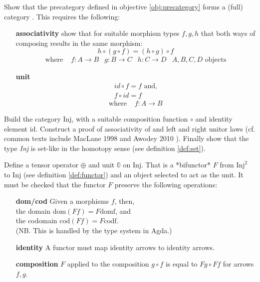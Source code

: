 \begin{objective} \label{obj:category}
  Show that the precategory defined in objective \ref{obj:precategory} forms a
  (full) category \cite{awodey2010-category-theory-book}. This requires the following:
  \begin{itemize}
  \item[\textbf{associativity}] show that for suitable morphism types $f,g,h$ that both ways of composing results in the same morphism:
    $$
    h \circ (g \circ f) = (h \circ g) \circ f
    $$
    \begin{align*}
      \text{where } & f : A \to B
      & g : B \to C
      & h : C \to D
      & A, B, C, D \text{ objects}
    \end{align*}
  \item[\textbf{unit}]
    \begin{align*}
    \mathit{id} \circ f = f \text{ and,}\\ 
    f \circ \mathit{id} = f
    \end{align*}
    \begin{align*}
      \text{where } & f : A \to B
    \end{align*}
  \end{itemize}

  Build the category \textrm{Inj}, with a suitable composition function $\circ$ and
  identity element $\mathrm{id}$. Construct a proof of associativity of and
  left and right unitor laws (cf. common texts include MacLane 1998 and Awodey
  2010 \cite{maclane1998-categories-book,awodey2010-category-theory-book}).
  Finally show that the type \textit{Inj} is set-like in the homotopy sense (see definition \ref{def:set}).
\end{objective}
\begin{objective} \label{obj:tensor}
  Define a tensor operator $\oplus$ and unit $𝟘$ on \textrm{Inj}.
  That is a *bifunctor* $F$ from $\textrm{Inj}^2$ to \textrm{Inj} (see definition \ref{def:functor}) and an object selected to act as the unit.
  It must be checked that the functor $F$ preserve the following operations:
  \begin{itemize}
  \item[\textbf{dom/cod}] Given a morphisms $f$, then, \\
    the domain $\mathrm{dom}(F f) = F \mathrm{dom f}$, and \\
    the codomain $\mathrm{cod}(F f) = F \mathrm{cod f}$. \\
    (NB. This is handled by the type system in Agda.)
  \item[\textbf{identity}] A functor must map identity arrows to identity arrows.
  \item[\textbf{composition}] $F$ applied to the composition $g \circ f$ is equal to $F g \circ F f$ for arrows $f,g$.
  \end{itemize}
\end{objective}

